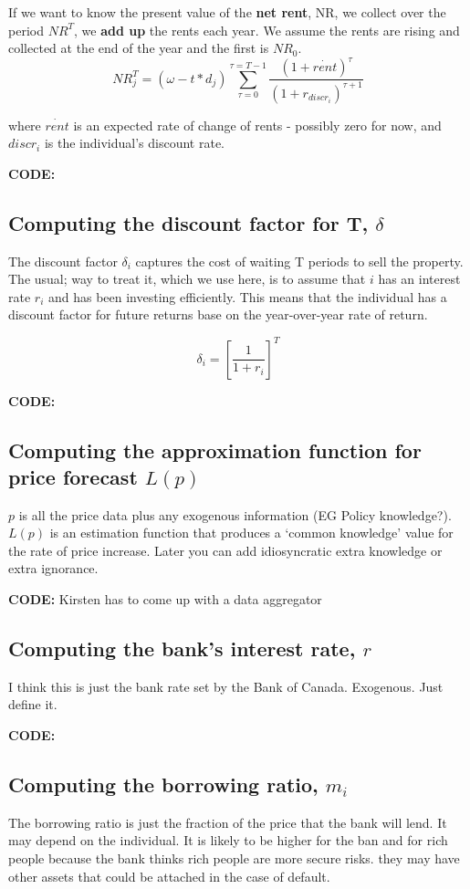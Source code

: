 If we want to know the  present value  of the \textbf{net rent}, NR, we collect over the period  $NR^T$, we \textbf{add up} the rents each year. We  assume the rents are rising and  collected at the end of the year and the first is $NR_0$.
\[NR_j^T= (\omega-t*d_j)\sum_{\tau=0}^{\tau=T-1} \frac{(1+\dot{rent})^{\tau}} {(1+r_{discr_i})^{\tau+1}} \]

where $\dot{rent}$ is an expected rate of change of rents - possibly zero for now, and $discr_i$ is the individual's discount rate.



\textbf{CODE:}  

\subsection{Computing the discount factor for T, $\delta$}
The discount factor $\delta_i$ captures the cost of waiting T periods to sell the property. The usual; way to treat it, which we use here, is to assume that $i$ has an interest rate $r_i$ and has been investing efficiently. This means that  the individual has a discount factor for future returns base on the year-over-year rate of return. 

\[\delta_i=\left[\frac{1}{1+r_i}\right]^T\]

\textbf{CODE:}  
\subsection{Computing the approximation function for price forecast $L(p)$}
$p$ is all the price data plus any exogenous information (EG Policy knowledge?). $L(p)$ is an estimation function that produces a `common knowledge' value for the rate of price increase. Later you can add idiosyncratic extra knowledge or extra ignorance.

\textbf{CODE:}  Kirsten has to come up with a data aggregator 



\subsection{Computing the bank's interest rate, $r$}

I think this is just the bank rate set by the Bank of Canada. Exogenous. Just define it.

\textbf{CODE:}  

\subsection{Computing the borrowing ratio, $m_i$}
The borrowing ratio is just the fraction of the price that the bank will lend. It may depend on the individual. It is likely to be higher for the ban and for rich people because the bank thinks rich people are more secure risks. they may have other assets that could be attached in the case of default.


